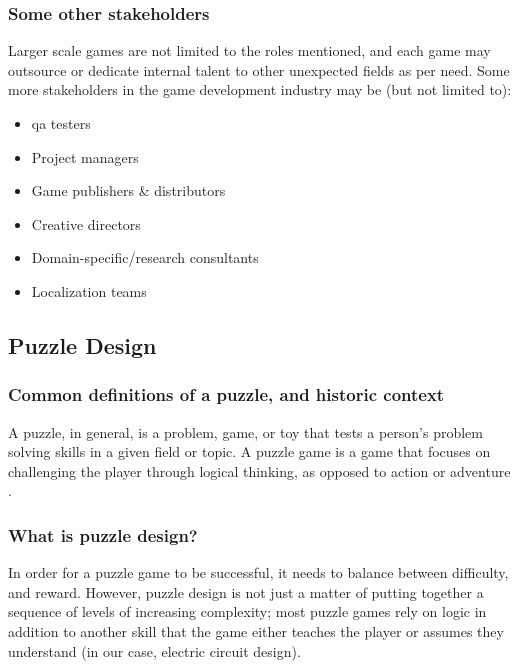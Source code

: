 \documentclass[../main.tex]{subfiles}
\begin{document}
\subsubsection{Some other stakeholders}
Larger scale games are not limited to the roles mentioned, and each game may outsource or dedicate internal talent to other unexpected fields as per need. Some more stakeholders in the game development industry may be (but not limited to):
\begin{itemize}
    \item \acrfull{qa} testers
    \item Project managers
    \item Game publishers \& distributors
    \item Creative directors
    \item Domain-specific/research consultants
    \item Localization teams
\end{itemize}

\subsection{Puzzle Design}
\subsubsection{Common definitions of a puzzle, and historic context}
A puzzle, in general, is a problem, game, or toy that tests a person’s problem solving skills in a given field or topic. A puzzle game is a game that focuses on challenging the player through logical thinking, as opposed to action or adventure \cite{15}.

\subsubsection{What is puzzle design?}
In order for a puzzle game to be successful, it needs to balance between difficulty, and reward. However, puzzle design is not just a matter of putting together a sequence of levels of increasing complexity; most puzzle games rely on logic in addition to another skill that the game either teaches the player or assumes they understand (in our case, electric circuit design). 
\end{document}
